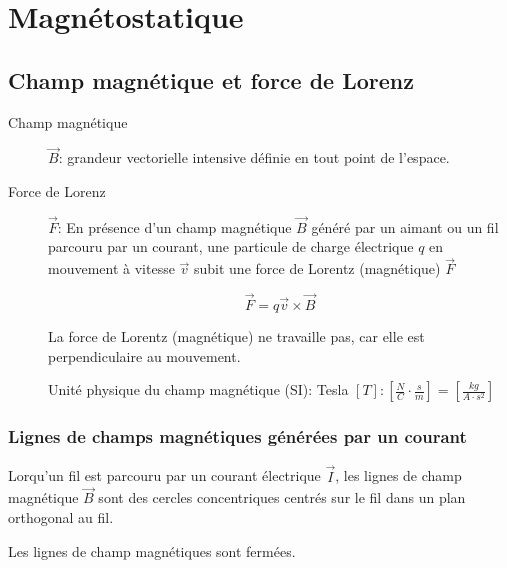 \documentclass[
    11pt,
    a4paper,
    oneside,
    headinlcude, footinclude,
    twoside,
]{report}
\renewcommand{\vec}[1]{\overrightarrow{#1}}
\begin{document}
\chapter{Magnétostatique}
\label{cha:magnetostatique}

\section{Champ magnétique et force de Lorenz}
\label{sec:champ_magnetique_et_force_de_lorenz}

\begin{description}
    \item[Champ magnétique] $\vec B$: grandeur vectorielle intensive définie en
        tout point de l'espace.

    \item[Force de Lorenz] $\vec F$: En présence d'un champ magnétique $\vec B$
        généré par un aimant ou un fil parcouru par un courant, une particule
        de charge électrique $q$ en mouvement à vitesse $\vec v$ subit une
        force de Lorentz (magnétique) $\vec F$

        \begin{equation}
            \label{eq:9.1}
            \vec F = q \vec v \times \vec B
        \end{equation}

        La force de Lorentz (magnétique) ne travaille pas, car elle est
        perpendiculaire au mouvement.

        Unité physique du champ magnétique (SI): Tesla $[T]: \left[\frac{N}{C}
        \cdot \frac{s}{m}\right] = \left[\frac{kg}{A\cdot s^2}\right]$
        
\end{description}

\subsection{Lignes de champs magnétiques générées par un courant}

Lorqu'un fil est parcouru par un courant électrique $\vec I$, les lignes de
champ magnétique $\vec B$ sont des cercles concentriques centrés sur le fil
dans un plan orthogonal au fil.

\begin{center}
\end{center}

Les lignes de champ magnétiques sont fermées.
\end{document}
